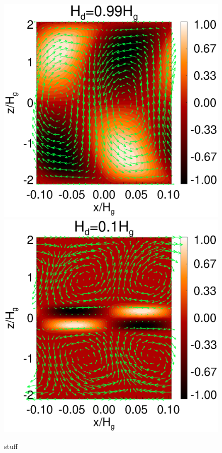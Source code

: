 \begin{figure}
  \includegraphics[scale=0.33, clip=true, trim=0.5cm 0cm 3cm 0cm]{figures/result2d_Hd1.ps}\includegraphics[scale=0.33, clip=true, trim=2cm 0cm 0cm 0cm]{figures/result2d_Hd0d1.ps} 
  \caption{
    stuff
    \label{result2d_fixZ}
    }
\end{figure}
